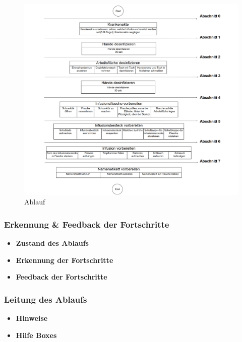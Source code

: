   \begin{figure}[ht]
  \begin{minipage}[t]{1\linewidth}
  \centering
  \includegraphics[width=\textwidth]{images/infusion_vorbereitung_durchlauf.png}
  \caption[Skillslab WebVR]{Ablauf}
  \end{minipage}
  \end{figure}
  
  \subsubsection{Erkennung \& Feedback der Fortschritte}
  \begin{itemize}
      \item \textbf{Zustand des Ablaufs}
      \item \textbf{Erkennung der Fortschritte}
      \item \textbf{Feedback der Fortschritte}
  \end{itemize}
  
  \subsubsection{Leitung des Ablaufs}
  \begin{itemize}
      \item \textbf{Hinweise}
      \item \textbf{Hilfe Boxes}
  \end{itemize}
  
